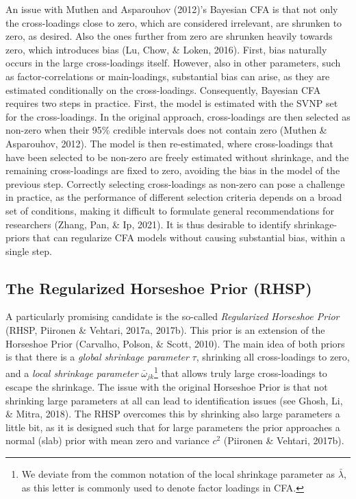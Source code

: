 \documentclass[
  man,floatsintext]{apa6}
\begin{document}
An issue with Muthen and Asparouhov (2012)'s Bayesian CFA is that not only the cross-loadings close to zero, which are considered irrelevant, are shrunken to zero, as desired. Also the ones further from zero are shrunken heavily towards zero, which introduces bias (Lu, Chow, \& Loken, 2016). First, bias naturally occurs in the large cross-loadings itself. However, also in other parameters, such as factor-correlations or main-loadings, substantial bias can arise, as they are estimated conditionally on the cross-loadings. Consequently, Bayesian CFA requires two steps in practice. First, the model is estimated with the SVNP set for the cross-loadings. In the original approach, cross-loadings are then selected as non-zero when their 95\% credible intervals does not contain zero (Muthen \& Asparouhov, 2012). The model is then re-estimated, where cross-loadings that have been selected to be non-zero are freely estimated without shrinkage, and the remaining cross-loadings are fixed to zero, avoiding the bias in the model of the previous step. Correctly selecting cross-loadings as non-zero can pose a challenge in practice, as the performance of different selection criteria depends on a broad set of conditions, making it difficult to formulate general recommendations for researchers (Zhang, Pan, \& Ip, 2021). It is thus desirable to identify shrinkage-priors that can regularize CFA models without causing substantial bias, within a single step.

\hypertarget{the-regularized-horseshoe-prior-rhsp}{%
\subsection{The Regularized Horseshoe Prior (RHSP)}\label{the-regularized-horseshoe-prior-rhsp}}

A particularly promising candidate is the so-called \emph{Regularized Horseshoe Prior} (RHSP, Piironen \& Vehtari, 2017a, 2017b). This prior is an extension of the Horseshoe Prior (Carvalho, Polson, \& Scott, 2010). The main idea of both priors is that there is a \emph{global shrinkage parameter} \(\tau\), shrinking all cross-loadings to zero, and a \emph{local shrinkage parameter} \(\bar{\omega}_{jk}\)\footnote{We deviate from the common notation of the local shrinkage parameter as \(\bar{\lambda}\), as this letter is commonly used to denote factor loadings in CFA.} that allows truly large cross-loadings to escape the shrinkage. The issue with the original Horseshoe Prior is that not shrinking large parameters at all can lead to identification issues (see Ghosh, Li, \& Mitra, 2018). The RHSP overcomes this by shrinking also large parameters a little bit, as it is designed such that for large parameters the prior approaches a normal (slab) prior with mean zero and variance \(c^2\) (Piironen \& Vehtari, 2017b).
\end{document}
